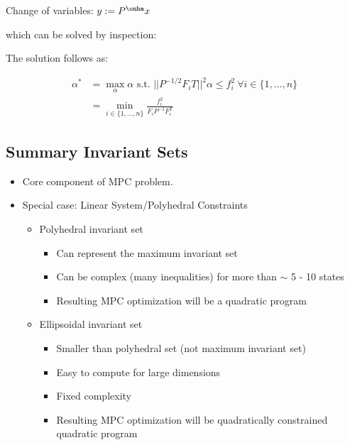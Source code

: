 \documentclass[8pt,a4paper]{scrartcl}
\begin{document}
\begin{multicols*}{3}
\begin{center}
\graphicspath{{Pictures/}}
\def\svgwidth{0.8\linewidth}

\end{center}

Change of variables: $y:=P^{\onha}x$


which can be solved by inspection:


The solution follows as:

\begin{align*}
\alpha^\ast&=\max\limits_{\alpha}\alpha\text{ s.t. }||P^{-1/2}F_iT||^2\alpha\leq f_i^2\ \forall i\in\{1,\ldots,n\} \\
&= \min\limits_{i\in\{1,\ldots,n\}}\frac{f_i^2}{F_iP^{-1}F_i^T}
\end{align*}

\subsection{Summary Invariant Sets}

\begin{itemize}
\item Core component of MPC problem.
\item Special case: Linear System/Polyhedral Constraints
\begin{itemize}
\item Polyhedral invariant set
\begin{itemize}
\item Can represent the maximum invariant set
\item Can be complex (many inequalities) for more than $\sim$ 5 - 10 states
\item Resulting MPC optimization will be a quadratic program
\end{itemize}
\item Ellipsoidal invariant set
\begin{itemize}
\item Smaller than polyhedral set (not maximum invariant set)
\item Easy to compute for large dimensions
\item Fixed complexity
\item Resulting MPC optimization will be quadratically constrained quadratic program
\end{itemize}
\end{itemize}
\end{itemize}


\end{multicols*}
\end{document}
